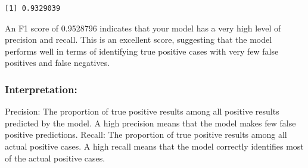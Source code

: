 \documentclass[
]{article}
\newenvironment{Shaded}{\begin{snugshade}}{\end{snugshade}}
\newcommand{\CommentTok}[1]{\textcolor[rgb]{0.56,0.35,0.01}{\textit{#1}}}
\newcommand{\DecValTok}[1]{\textcolor[rgb]{0.00,0.00,0.81}{#1}}
\newcommand{\FunctionTok}[1]{\textcolor[rgb]{0.13,0.29,0.53}{\textbf{#1}}}
\newcommand{\NormalTok}[1]{#1}
\newcommand{\OtherTok}[1]{\textcolor[rgb]{0.56,0.35,0.01}{#1}}
\newcommand{\SpecialCharTok}[1]{\textcolor[rgb]{0.81,0.36,0.00}{\textbf{#1}}}
\begin{document}
\begin{Shaded}
\end{Shaded}

\begin{verbatim}
[1] 0.9329039
\end{verbatim}

An F1 score of 0.9528796 indicates that your model has a very high level
of precision and recall. This is an excellent score, suggesting that the
model performs well in terms of identifying true positive cases with
very few false positives and false negatives.

\subsubsection{Interpretation:}\label{interpretation}

Precision: The proportion of true positive results among all positive
results predicted by the model. A high precision means that the model
makes few false positive predictions. Recall: The proportion of true
positive results among all actual positive cases. A high recall means
that the model correctly identifies most of the actual positive cases.
\end{document}
